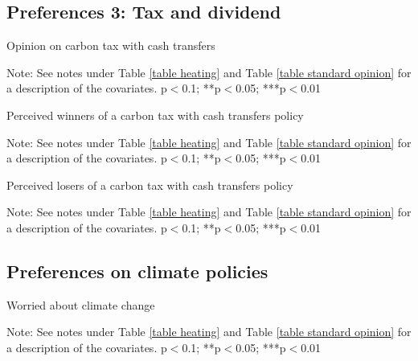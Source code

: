 \documentclass{article}
\begin{document}
\clearpage
\subsection{Preferences 3: Tax and dividend}

\begin{table}[h!]
	\caption{Opinion on carbon tax with cash transfers}
	\begin{center}
		\scalebox{0.7}{}
	\end{center}
	{\footnotesize Note: See notes under Table \ref{table heating} and Table \ref{table standard opinion} for a description of the covariates.
	\newline *p$<$0.1; **p$<$0.05; ***p$<$0.01}
\end{table}	

\begin{table}[h!]
	\caption{Perceived winners of a carbon tax with cash transfers policy}
	\begin{center}
		\scalebox{0.7}{}
	\end{center}
	{\footnotesize Note: See notes under Table \ref{table heating} and Table \ref{table standard opinion} for a description of the covariates.
	\newline *p$<$0.1; **p$<$0.05; ***p$<$0.01}
\end{table}	

\begin{table}[h!]
	\caption{Perceived losers of a carbon tax with cash transfers policy}
	\begin{center}
		\scalebox{0.7}{}
	\end{center}
	{\footnotesize Note: See notes under Table \ref{table heating} and Table \ref{table standard opinion} for a description of the covariates.
	\newline *p$<$0.1; **p$<$0.05; ***p$<$0.01}
\end{table}	

\clearpage
\subsection{Preferences on climate policies}

\begin{table}[h!]
	\caption{Worried about climate change}
	\begin{center}
		\scalebox{0.7}{}
	\end{center}
	{\footnotesize Note: See notes under Table \ref{table heating} and Table \ref{table standard opinion} for a description of the covariates.
	\newline *p$<$0.1; **p$<$0.05; ***p$<$0.01}
\end{table}	
\end{document}
